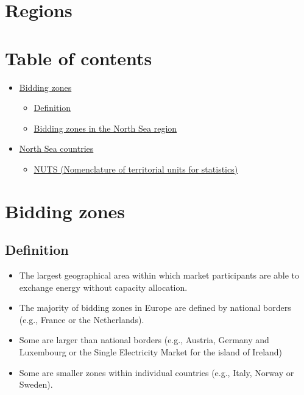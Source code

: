 \hypertarget{regions}{%
\section{Regions}\label{regions}}

\hypertarget{table-of-contents-omit-in-toc-}{%
\section{Table of contents}\label{table-of-contents-omit-in-toc-}}

\begin{itemize}
\tightlist
\item
  \protect\hyperlink{bidding-zones}{Bidding zones}

  \begin{itemize}
  \tightlist
  \item
    \protect\hyperlink{definition}{Definition}
  \item
    \protect\hyperlink{bidding-zones-in-the-north-sea-region}{Bidding
    zones in the North Sea region}
  \end{itemize}
\item
  \protect\hyperlink{north-sea-countries}{North Sea countries}

  \begin{itemize}
  \tightlist
  \item
    \protect\hyperlink{nuts-nomenclature-of-territorial-units-for-statistics}{NUTS
    (Nomenclature of territorial units for statistics)}
  \end{itemize}
\end{itemize}

\hypertarget{bidding-zones}{%
\section{Bidding zones}\label{bidding-zones}}

\hypertarget{definition}{%
\subsection{Definition}\label{definition}}

\begin{itemize}
\tightlist
\item
  The largest geographical area within which market participants are
  able to exchange energy without capacity allocation.
\item
  The majority of bidding zones in Europe are defined by national
  borders (e.g., France or the Netherlands).
\item
  Some are larger than national borders (e.g., Austria, Germany and
  Luxembourg or the Single Electricity Market for the island of Ireland)
\item
  Some are smaller zones within individual countries (e.g., Italy,
  Norway or Sweden).
\end{itemize}

